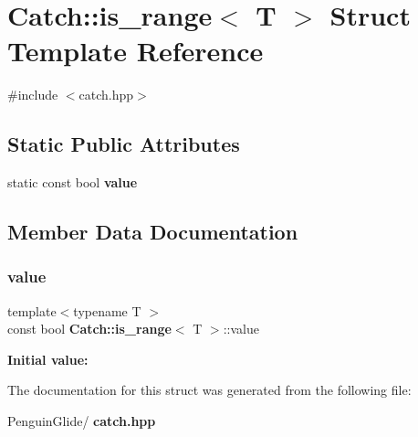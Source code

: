\section{Catch\+::is\+\_\+range$<$ T $>$ Struct Template Reference}
\label{struct_catch_1_1is__range}


{\ttfamily \#include $<$catch.\+hpp$>$}

\subsection*{Static Public Attributes}
\begin{DoxyCompactItemize}
\item 
static const bool \textbf{ value}
\end{DoxyCompactItemize}


\subsection{Member Data Documentation}
\mbox{\label{struct_catch_1_1is__range_afaec39e819c3956829cbbd00feba11be}} 
\subsubsection{value}
{\footnotesize\ttfamily template$<$typename T $>$ \\
const bool \textbf{ Catch\+::is\+\_\+range}$<$ T $>$\+::value\hspace{0.3cm}{\ttfamily [static]}}

{\bfseries Initial value\+:}
\begin{DoxyCode}{0}
\DoxyCodeLine{=}

\end{DoxyCode}


The documentation for this struct was generated from the following file\+:\begin{DoxyCompactItemize}
\item 
Penguin\+Glide/\textbf{ catch.\+hpp}\end{DoxyCompactItemize}
